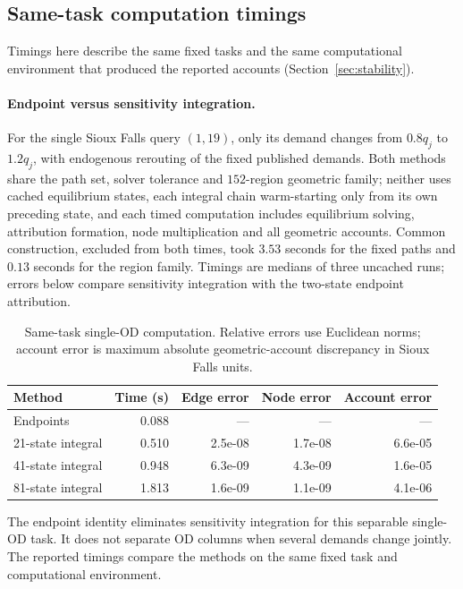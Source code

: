 \subsection{Same-task computation timings}\label{supp:timing}
Timings here describe the same fixed tasks and the same computational
environment that produced the reported accounts
(Section~\ref{sec:stability}).

\paragraph{Endpoint versus sensitivity integration.}
For the single Sioux Falls query $(1,19)$, only its demand changes from
$0.8q_j$ to $1.2q_j$, with endogenous rerouting of the fixed published
demands. Both methods share the path set, solver tolerance and
$152$-region geometric family; neither uses cached equilibrium states,
each integral chain warm-starting only from its own preceding state,
and each timed computation includes equilibrium solving, attribution
formation, node multiplication and all geometric accounts. Common
construction, excluded from both times, took $3.53$ seconds for the
fixed paths and $0.13$ seconds for the region family. Timings are
medians of three uncached runs; errors below compare sensitivity
integration with the two-state endpoint attribution.
\begin{table}[pos=t]\centering\small\caption{Same-task single-OD computation. Relative errors use Euclidean norms; account error is maximum absolute geometric-account discrepancy in Sioux Falls units.}\label{tab:endpointbenchmark}\begin{tabular}{lrrrr}\toprule Method & Time (s) & Edge error & Node error & Account error\\\midrule
Endpoints & 0.088 & --- & --- & ---\\
21-state integral & 0.510 & 2.5e-08 & 1.7e-08 & 6.6e-05\\
41-state integral & 0.948 & 6.3e-09 & 4.3e-09 & 1.6e-05\\
81-state integral & 1.813 & 1.6e-09 & 1.1e-09 & 4.1e-06\\
\bottomrule\end{tabular}\end{table}
The endpoint identity eliminates sensitivity integration for this
separable single-OD task. It does not separate OD columns when several
demands change jointly. The reported timings compare the methods on the
same fixed task and computational environment.

